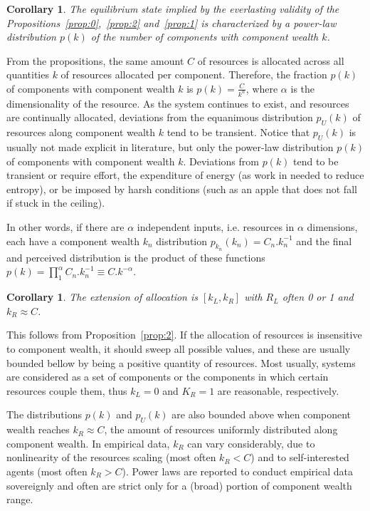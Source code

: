 \documentclass[a4paper, 11pt]{article} %
\newtheorem{corollary}[theorem2]{Corollary}
\begin{document}
\begin{corollary}\label{prop:3}
	The equilibrium state implied by the everlasting validity of the Propositions~\ref{prop:0},~\ref{prop:2} and~\ref{prop:1} is characterized by
	a power-law distribution $p(k)$ of the number of components with component wealth $k$.
\end{corollary}

From the propositions, the same amount $C$ of resources is allocated
across all quantities $k$ of resources allocated per component.
Therefore, the fraction $p(k)$ of components with component wealth $k$ is
$p(k)=\frac{C}{k^\alpha}$, where $\alpha$ is
the dimensionality of the resource.
As the system continues to exist,
and resources are continually allocated, deviations from the equanimous
distribution $p_U(k)$ of resources along component wealth $k$
 tend to be transient.
 Notice that $p_U(k)$ is usually not made explicit in literature, but only
 the power-law distribution $p(k)$ of components
with component wealth $k$.
Deviations from $p(k)$ tend to be transient or require effort, the expenditure of energy (as work in needed to reduce entropy), or be imposed by harsh conditions (such as an apple that does not fall if stuck in the ceiling).

In other words,
if there are $\alpha$ independent inputs,
i.e. resources in $\alpha$ dimensions,
each have a component wealth $k_n$ distribution
$p_{k_n}(k_n)=C_n.k_n^{-1}$
and the final and perceived distribution
is the product of these functions
$p(k) = \prod_1^{\alpha} C_n.k_n^{-1}\equiv C.k^{-\alpha}$. 

 \begin{corollary}\label{cor:2}
	The extension of allocation is $[k_L,k_R]$ with $R_L$ often 0 or 1 and $k_R\approx C$.
\end{corollary}

This follows from Proposition~\ref{prop:2}.
If the allocation of resources is insensitive to component wealth,
it should sweep all possible values, and these are usually
bounded bellow by being a positive quantity of resources.
Most usually, systems are considered as a set of components
or the components in which certain resources couple them,
thus $k_L=0$ and $K_R=1$ are reasonable, respectively.

The distributions $p(k)$ and $p_U(k)$ are also
bounded above when component wealth reaches $k_R \approx C$,
the amount of resources uniformly distributed along component wealth.
In empirical data, $k_R$ can vary considerably, due to
nonlinearity of the resources scaling (most often $k_R<C$) and
to self-interested agents (most often $k_R>C$).
Power laws are reported to conduct empirical data sovereignly and
often are strict only for a
(broad) portion of component wealth range.
\end{document}

